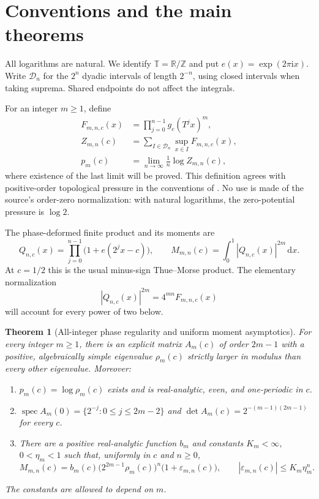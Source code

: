 \documentclass[11pt,a4paper]{article}
\numberwithin{equation}{section}
\newtheorem{theorem}{Theorem}[section]
\theoremstyle{definition}
\theoremstyle{remark}
\newcommand{\TT}{\mathbb T}
\newcommand{\RR}{\mathbb R}
\newcommand{\ZZ}{\mathbb Z}
\newcommand{\ii}{\mathrm i}
\newcommand{\dd}{\,\mathrm d}
\newcommand{\spec}{\operatorname{spec}}
\begin{document}
\section{Conventions and the main theorems}
\label{sec:main}
All logarithms are natural. We identify $\TT=\RR/\ZZ$ and put
$e(x)=\exp(2\pi\ii x)$. Write $\mathcal D_n$ for the $2^n$ dyadic
intervals of length $2^{-n}$, using closed intervals when taking suprema.
Shared endpoints do not affect the integrals.

For an integer $m\geq1$, define
\begin{align}
 F_{m,n,c}(x)&=\prod_{j=0}^{n-1}g_c(T^jx)^m,\\
 Z_{m,n}(c)&=\sum_{I\in\mathcal D_n}\sup_{x\in I}F_{m,n,c}(x),\\
 p_m(c)&=\lim_{n\to\infty}\frac1n\log Z_{m,n}(c),
 \label{eq:pressure-definition}
\end{align}
where existence of the last limit will be proved. This definition agrees
with positive-order topological pressure in the conventions of
\cite{GKS}. No use is made of the source's order-zero normalization:
with natural logarithms, the zero-potential pressure is $\log2$.

The phase-deformed finite product and its moments are
\begin{equation}
 Q_{n,c}(x)=\prod_{j=0}^{n-1}\bigl(1+e(2^jx-c)\bigr),\qquad
 M_{m,n}(c)=\int_0^1|Q_{n,c}(x)|^{2m}\dd x.
 \label{eq:Q}
\end{equation}
At $c=1/2$ this is the usual minus-sign Thue--Morse product. The elementary
normalization
\begin{equation}
 |Q_{n,c}(x)|^{2m}=4^{mn}F_{m,n,c}(x)
 \label{eq:normalization}
\end{equation}
will account for every power of two below.

\begin{theorem}[All-integer phase regularity and uniform moment asymptotics]
\label{thm:main-analytic}
For every integer $m\geq1$, there is an explicit matrix $A_m(c)$ of order
$2m-1$ with a positive, algebraically simple eigenvalue $\rho_m(c)$
strictly larger in modulus than every other eigenvalue. Moreover:
\begin{enumerate}[label=\textnormal{(\roman*)}]
\item $p_m(c)=\log\rho_m(c)$ exists and is real-analytic, even, and
one-periodic in $c$.
\item $\spec A_m(0)=\{2^{-j}:0\leq j\leq2m-2\}$ and
$\det A_m(c)=2^{-(m-1)(2m-1)}$ for every $c$.
\item There are a positive real-analytic function $b_m$ and constants
$K_m<\infty$, $0<\eta_m<1$ such that, uniformly in $c$ and $n\geq0$,
\[
 M_{m,n}(c)=b_m(c)\bigl(2^{2m-1}\rho_m(c)\bigr)^n
 \bigl(1+\varepsilon_{m,n}(c)\bigr),\qquad
 |\varepsilon_{m,n}(c)|\leq K_m\eta_m^n.
\]
\end{enumerate}
The constants are allowed to depend on $m$.
\end{theorem}
\end{document}
